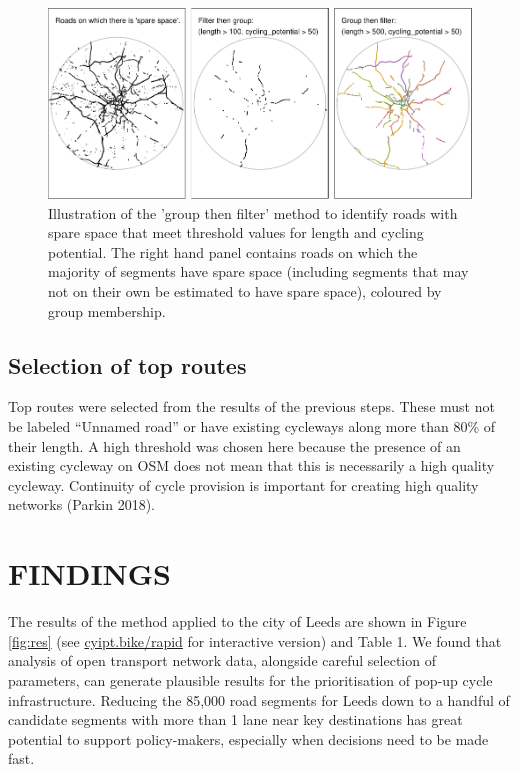 \documentclass[
]{article}
\begin{document}
\begin{figure}
\includegraphics[width=1\linewidth]{article_files/figure-latex/levels-1} \caption{Illustration of the 'group then filter' method to identify roads with spare space that meet threshold values for length and cycling potential. The right hand panel contains roads on which the majority of segments have spare space (including segments that may not on their own be estimated to have spare space), coloured by group membership.}\label{fig:levels}
\end{figure}

\hypertarget{selection-of-top-routes}{%
\subsection{Selection of top routes}\label{selection-of-top-routes}}

Top routes were selected from the results of the previous steps.
These must not be labeled ``Unnamed road'' or have existing cycleways along more than 80\% of their length.
A high threshold was chosen here because the presence of an existing cycleway on OSM does not mean that this is necessarily a high quality cycleway.
Continuity of cycle provision is important for creating high quality networks (Parkin 2018).

\hypertarget{findings}{%
\section{FINDINGS}\label{findings}}

The results of the method applied to the city of Leeds are shown in Figure \ref{fig:res} (see \href{https://www.cyipt.bike/rapid/west-yorkshire/}{cyipt.bike/rapid} for interactive version) and Table 1.
We found that analysis of open transport network data, alongside careful selection of parameters, can generate plausible results for the prioritisation of pop-up cycle infrastructure.
Reducing the 85,000 road segments for Leeds down to a handful of candidate segments with more than 1 lane near key destinations has great potential to support policy-makers, especially when decisions need to be made fast.
\end{document}
